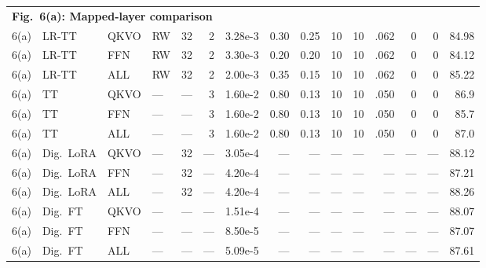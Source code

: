 \documentclass[AMA,LATO1COL]{WileyNJDv5}
\begin{document}
{\begin{longtable}{@{}l l l l r r r r r r r r r r r@{}}
\multicolumn{15}{l}{\cellcolor{HeadGray}\textbf{Fig.~6(a): Mapped-layer comparison}} \\
6(a) & LR-TT & QKVO & RW & 32 & 2 & 3.28e-3 & 0.30 & 0.25 & 10 & 10 & .062 & 0 & 0 & 84.98 \\
6(a) & LR-TT & FFN & RW & 32 & 2 & 3.30e-3 & 0.20 & 0.20 & 10 & 10 & .062 & 0 & 0 & 84.12 \\
6(a) & LR-TT & ALL & RW & 32 & 2 & 2.00e-3 & 0.35 & 0.15 & 10 & 10 & .062 & 0 & 0 & 85.22 \\
6(a) & TT & QKVO & --- & --- & 3 & 1.60e-2 & 0.80 & 0.13 & 10 & 10 & .050 & 0 & 0 & 86.9 \\
6(a) & TT & FFN & --- & --- & 3 & 1.60e-2 & 0.80 & 0.13 & 10 & 10 & .050 & 0 & 0 & 85.7 \\
6(a) & TT & ALL & --- & --- & 3 & 1.60e-2 & 0.80 & 0.13 & 10 & 10 & .050 & 0 & 0 & 87.0 \\
6(a) & Dig.\ LoRA & QKVO & --- & 32 & --- & 3.05e-4 & --- & --- & --- & --- & --- & --- & --- & 88.12 \\
6(a) & Dig.\ LoRA & FFN & --- & 32 & --- & 4.20e-4 & --- & --- & --- & --- & --- & --- & --- & 87.21 \\
6(a) & Dig.\ LoRA & ALL & --- & 32 & --- & 4.20e-4 & --- & --- & --- & --- & --- & --- & --- & 88.26 \\
6(a) & Dig.\ FT & QKVO & --- & --- & --- & 1.51e-4 & --- & --- & --- & --- & --- & --- & --- & 88.07 \\
6(a) & Dig.\ FT & FFN & --- & --- & --- & 8.50e-5 & --- & --- & --- & --- & --- & --- & --- & 87.07 \\
6(a) & Dig.\ FT & ALL & --- & --- & --- & 5.09e-5 & --- & --- & --- & --- & --- & --- & --- & 87.61 \\
\midrule


\end{longtable}}
\end{document}

